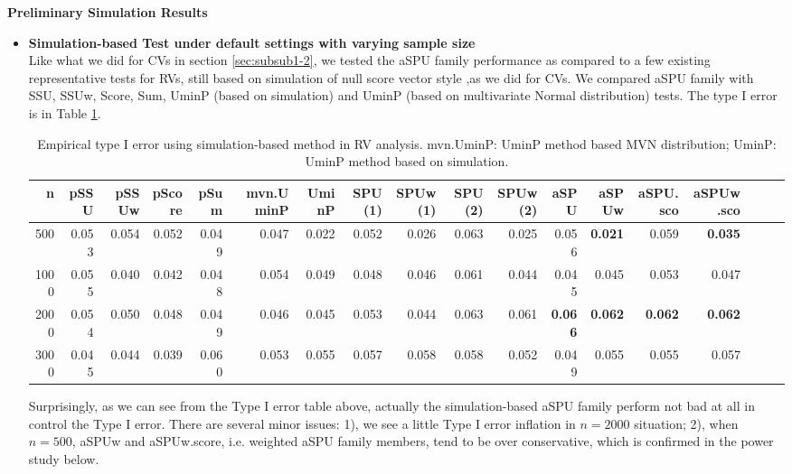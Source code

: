 \documentclass[12pt]{article}
\begin{document}
\textbf{Preliminary Simulation Results}
\begin{itemize}
\item \textbf{Simulation-based Test under default settings with varying sample size}\\
Like what we did for CVs in section \ref{sec:subsub1-2}, we tested the aSPU family performance as compared to a few existing representative tests for RVs, still based on simulation of null score vector style ,as we did for CVs. We compared aSPU family with SSU, SSUw, Score, Sum, UminP (based on simulation) and UminP (based on multivariate Normal distribution) tests. The type I error is in Table \ref{table:Empirical type I error using simulation-based method in RV analysis}.\\


\begin{table}[ht]
\resizebox{0.66\textwidth}{!}
{\begin{minipage}{\textwidth}
\centering
\begin{tabular}{rrrrrrrrrrrrrrrrrr}
  \hline
 n & pSSU & pSSUw & pScore & pSum & mvn.UminP  & UminP & SPU(1) & SPUw(1) & SPU(2) & SPUw(2) & aSPU & aSPUw & aSPU.sco & aSPUw.sco \\
  \hline
500  & 0.053 & 0.054 & 0.052 & 0.049 & 0.047  & 0.022 & 0.052 & 0.026 & 0.063 & 0.025  & 0.056 & \textbf{0.021} & 0.059 & \textbf{0.035} \\
1000 & 0.055 & 0.040 & 0.042 & 0.048 & 0.054  & 0.049 & 0.048 & 0.046 & 0.061 & 0.044  & 0.045 & 0.045 & 0.053 & 0.047 \\
2000 & 0.054 & 0.050 & 0.048 & 0.049 & 0.046  & 0.045 & 0.053 & 0.044 & 0.063 & 0.061  & \textbf{0.066} & \textbf{0.062} & \textbf{0.062} & \textbf{0.062} \\
3000 & 0.045 & 0.044 & 0.039 & 0.060 & 0.053  & 0.055 & 0.057 & 0.058 & 0.058 & 0.052  & 0.049 & 0.055 & 0.055 & 0.057 \\
   \hline
\end{tabular}
\caption{Empirical type I error using simulation-based method in RV analysis. mvn.UminP: UminP method based MVN distribution; UminP: UminP method based on simulation.  \label{table:Empirical type I error using simulation-based method in RV analysis}}
\end{minipage}}
\end{table}

Surprisingly, as we can see from the Type I error table above, actually the simulation-based aSPU family perform not bad at all in control the Type I error. There are several minor issues: 1), we see a little Type I error inflation in $n = 2000$ situation; 2), when $n = 500$, aSPUw and aSPUw.score, i.e. weighted aSPU family members, tend to be over conservative, which is confirmed in the power study below.  


\end{itemize}
\end{document}
